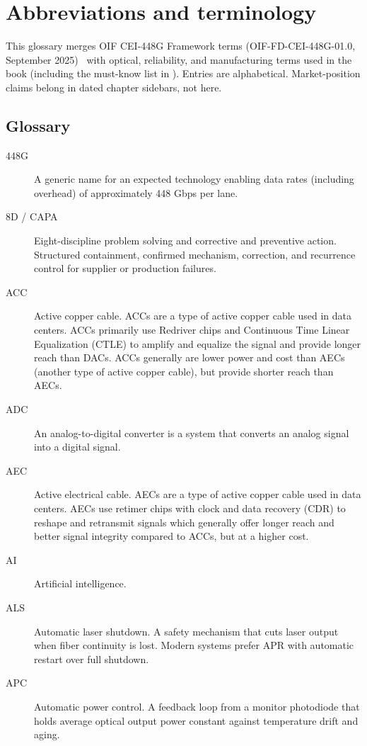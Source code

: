 \chapter{Abbreviations and terminology}
\label{ch:abbrev}
\label{app:abbreviations}

This glossary merges OIF CEI-448G Framework terms (OIF-FD-CEI-448G-01.0,
September 2025)~\cite{cei448} with optical, reliability, and manufacturing terms
used in the book (including the must-know list in ).
Entries are alphabetical. Market-position claims belong in dated chapter
sidebars, not here.

\section{Glossary}
\small
\begin{description}
\item[448G] A generic name for an expected technology enabling data rates (including overhead) of approximately 448 Gbps per lane.
\item[8D / CAPA] Eight-discipline problem solving and corrective and preventive action. Structured containment, confirmed mechanism, correction, and recurrence control for supplier or production failures.
\item[ACC] Active copper cable. ACCs are a type of active copper cable used in data centers. ACCs primarily use Redriver chips and Continuous Time Linear Equalization (CTLE) to amplify and equalize the signal and provide longer reach than DACs. ACCs generally are lower power and cost than AECs (another type of active copper cable), but provide shorter reach than AECs.
\item[ADC] An analog-to-digital converter is a system that converts an analog signal into a digital signal.
\item[AEC] Active electrical cable. AECs are a type of active copper cable used in data centers. AECs use retimer chips with clock and data recovery (CDR) to reshape and retransmit signals which generally offer longer reach and better signal integrity compared to ACCs, but at a higher cost.
\item[AI] Artificial intelligence.
\item[ALS] Automatic laser shutdown. A safety mechanism that cuts laser output when fiber continuity is lost. Modern systems prefer APR with automatic restart over full shutdown.
\item[APC] Automatic power control. A feedback loop from a monitor photodiode that holds average optical output power constant against temperature drift and aging.

\end{description}
